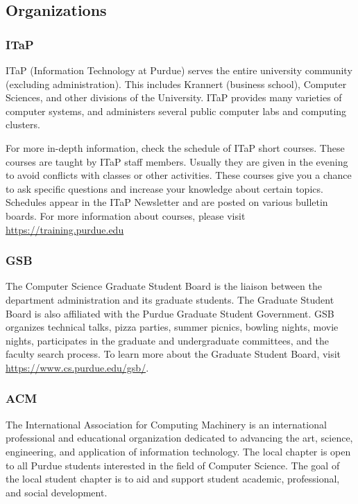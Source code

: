 \subsection{Organizations}

\subsubsection{ITaP}
ITaP (Information Technology at Purdue) serves the entire university community (excluding administration). This includes Krannert (business school), Computer Sciences, and other divisions of the University. ITaP provides many varieties of computer systems, and administers several public computer labs and computing clusters.

For more in-depth information, check the schedule of ITaP short courses. These courses are taught by ITaP staff members. Usually they are given in the evening to avoid conflicts with classes or other activities. These courses give you a chance to ask specific questions and increase your knowledge about certain topics. Schedules appear in the ITaP Newsletter and are posted on various bulletin boards. For more information about courses, please visit \url{https://training.purdue.edu}



\subsubsection{GSB}
The Computer Science Graduate Student Board is the liaison between the department administration and its graduate students. The Graduate Student Board is also affiliated with the Purdue Graduate Student Government. GSB organizes technical talks, pizza parties, summer picnics, bowling nights, movie nights, participates in the graduate and undergraduate committees, and the faculty search process. To learn more about the Graduate Student Board, visit \url{https://www.cs.purdue.edu/gsb/}.



\subsubsection{ACM}
The International Association for Computing Machinery is an international professional and educational organization dedicated to advancing the art, science, engineering, and application of information technology. The local chapter is open to all Purdue students interested in the field of Computer Science. The goal of the local student chapter is to aid and support student academic, professional, and social development.

